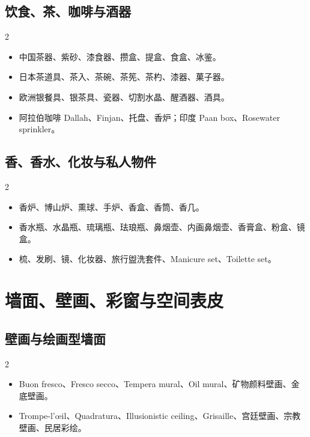 \documentclass[lang=en,a4paper,11pt]{elegantpaper}
\begin{document}
\subsection{饮食、茶、咖啡与酒器}


\begin{multicols}{2}
\begin{itemize}
\item 中国茶器、紫砂、漆食器、攒盒、提盒、食盒、冰鉴。
\item 日本茶道具、茶入、茶碗、茶筅、茶杓、漆器、菓子器。
\item 欧洲银餐具、银茶具、瓷器、切割水晶、醒酒器、酒具。
\item 阿拉伯咖啡 Dallah、Finjan、托盘、香炉；印度 Paan box、Rosewater sprinkler。
\end{itemize}
\end{multicols}

\subsection{香、香水、化妆与私人物件}


\begin{multicols}{2}
\begin{itemize}
\item 香炉、博山炉、熏球、手炉、香盒、香筒、香几。
\item 香水瓶、水晶瓶、琉璃瓶、珐琅瓶、鼻烟壶、内画鼻烟壶、香膏盒、粉盒、镜盒。
\item 梳、发刷、镜、化妆器、旅行盥洗套件、Manicure set、Toilette set。
\end{itemize}
\end{multicols}

\section{墙面、壁画、彩窗与空间表皮}


\subsection{壁画与绘画型墙面}


\begin{multicols}{2}
\begin{itemize}
\item Buon fresco、Fresco secco、Tempera mural、Oil mural、矿物颜料壁画、金底壁画。
\item Trompe-l'œil、Quadratura、Illusionistic ceiling、Grisaille、宫廷壁画、宗教壁画、民居彩绘。
\end{itemize}
\end{multicols}
\end{document}
